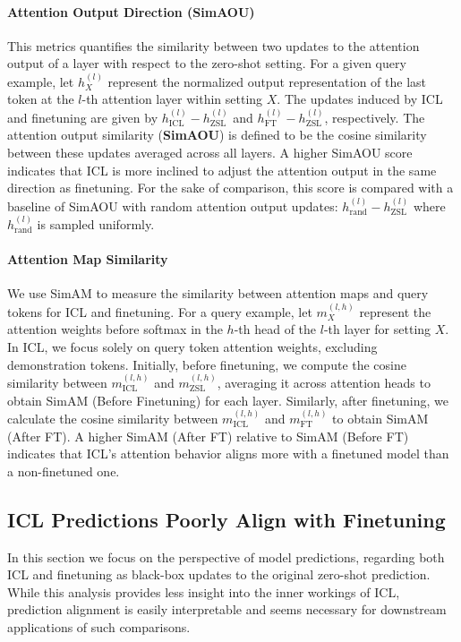 \paragraph{Attention Output Direction (SimAOU)}
This metrics quantifies the similarity between two updates to the attention output of a layer with respect to the zero-shot setting. 
For a given query example, let $h^{(l)}_X$ represent the normalized output representation of the last token at the $l$-th attention layer within setting $X$.
The updates induced by ICL and finetuning are given by $h^{(l)}_{\text{ICL}} - h^{(l)}_{\text{ZSL}}$ and $h^{(l)}_{\text{FT}} - h^{(l)}_{\text{ZSL}}$, respectively.
The attention output similarity (\textbf{SimAOU}) is defined to be the cosine similarity between these updates averaged across all layers.
A higher SimAOU score indicates that ICL is more inclined to adjust the attention output in the same direction as finetuning.
For the sake of comparison, this score is compared with a baseline of SimAOU with random attention output updates: $h^{(l)}_{\text{rand}} - h^{(l)}_{\text{ZSL}}$ where $h^{(l)}_{\text{rand}}$ is sampled uniformly.

\paragraph{Attention Map Similarity}
We use SimAM to measure the similarity between attention maps and query tokens for ICL and finetuning.
For a query example, let $m^{(l,h)}_X$ represent the attention weights before softmax in the $h$-th head of the $l$-th layer for setting $X$. In ICL, we focus solely on query token attention weights, excluding demonstration tokens. Initially, before finetuning, we compute the cosine similarity between $m^{(l,h)}_{\text{ICL}}$ and $m^{(l,h)}_{\text{ZSL}}$, averaging it across attention heads to obtain SimAM (Before Finetuning) for each layer.
Similarly, after finetuning, we calculate the cosine similarity between $m^{(l,h)}_{\text{ICL}}$ and $m^{(l,h)}_{\text{FT}}$ to obtain SimAM (After FT). A higher SimAM (After FT) relative to SimAM (Before FT) indicates that ICL's attention behavior aligns more with a finetuned model than a non-finetuned one.


\subsection{ICL Predictions Poorly Align with Finetuning}

In this section we focus on the perspective of model predictions, regarding both ICL and finetuning as black-box updates to the original zero-shot prediction.
While this analysis provides less insight into the inner workings of ICL, prediction alignment is easily interpretable and seems necessary for downstream applications of such comparisons.

